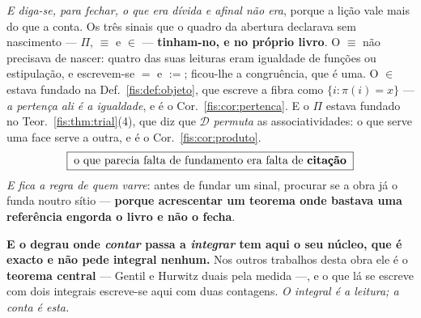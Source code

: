 \documentclass[livro.tex]{subfiles}
\begin{document}
\medskip\noindent\emph{E diga-se, para fechar, o que era dívida e afinal não era},
porque a lição vale mais do que a conta. Os três sinais que o quadro da abertura
declarava sem nascimento --- $\Pi$, $\equiv$ e $\in$ --- \textbf{tinham-no, e no
próprio livro}. O $\equiv$ não precisava de nascer: quatro das suas leituras eram
igualdade de funções ou estipulação, e escrevem-se $=$ e $:=$; ficou-lhe a
congruência, que é uma. O $\in$ estava fundado na Def.~\ref{fis:def:objeto}, que
escreve a fibra como $\{i:\pi(i)=x\}$ --- \emph{a pertença ali é a igualdade}, e é
o Cor.~\ref{fis:cor:pertenca}. E o $\Pi$ estava fundado no
Teor.~\ref{fis:thm:trial}(4), que diz que $\mathcal{D}$ \emph{permuta} as
associatividades: o que serve uma face serve a outra, e é o
Cor.~\ref{fis:cor:produto}.
\[
\boxed{\;\text{o que parecia falta de fundamento era falta de \textbf{citação}}\;}
\]
\emph{E fica a regra de quem varre}: antes de fundar um sinal, procurar se a obra
já o funda noutro sítio --- \textbf{porque acrescentar um teorema onde bastava uma
referência engorda o livro e não o fecha}.

\medskip\noindent\textbf{E o degrau onde \emph{contar} passa a \emph{integrar}
tem aqui o seu núcleo, que é exacto e não pede integral nenhum.} Nos outros
trabalhos desta obra ele é o \textbf{teorema central} --- Gentil e Hurwitz duais
pela medida ---, e o que lá se escreve com dois integrais escreve-se aqui com
duas contagens. \emph{O integral é a leitura; a conta é esta.}
\end{document}

